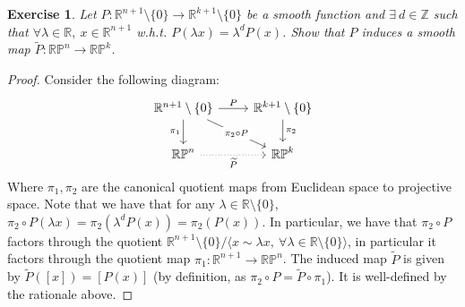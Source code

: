 \documentclass{article}
\newcommand{\bb}[1]{\mathbb{#1}}
\newtheorem{exercise}{Exercise}
\begin{document}
\begin{exercise}
  Let $P: \bb{R}^{n+1}\setminus \{0\} \to \bb{R}^{k+1}\setminus \{0\}$ be a smooth function and $\exists \ d \in \bb{Z}$  such that $\forall \lambda \in \bb{R}, \ x \in \bb{R}^{n+1}$ w.h.t. $P(\lambda x) = \lambda^{d}P(x)$. Show that $P$ induces a smooth map $\widetilde{P}: \bb{RP}^{n} \to \bb{RP}^{k}$.
\end{exercise}
\begin{proof}
  Consider the following diagram:
  \[
    \begin{tikzcd}
\mathbb{R}^{n+1}\setminus \{0\} \arrow[r, "P"] \arrow[d, "\pi_1"'] \arrow[rd, "\pi_2 \circ P" description] & \mathbb{R}^{k+1}\setminus \{0\} \arrow[d, "\pi_2"] \\
\mathbb{RP}^{n} \arrow[r, "\widetilde{P}"', dotted]                                         & \mathbb{RP}^{k}                    
\end{tikzcd}
\]
Where $\pi_{1}, \pi_{2}$ are the canonical quotient maps from Euclidean space to projective space. Note that we have that for any $\lambda \in \bb{R} \setminus \{0\}$, $\pi_{2} \circ P(\lambda x) = \pi_{2}(\lambda^{d}P(x)) = \pi_{2}(P(x))$. In particular, we have that $\pi_{2} \circ P$ factors through the quotient $\bb{R}^{n+1}\setminus \{0\}/\langle x \sim \lambda x, \ \forall \lambda \in \bb{R}\setminus \{0\}\rangle$, in particular it factors through the quotient map $\pi_{1}: \bb{R}^{n+1} \to \bb{RP}^{n}$. The induced map $\widetilde{P}$ is given by $\widetilde{P}([x]) = [P(x)]$ (by definition, as $\pi_{2}\circ P = \widetilde{P} \circ \pi_{1}$). It is well-defined by the rationale above. 


\end{proof}
\end{document}

